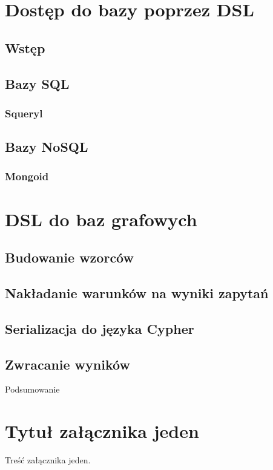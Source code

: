 \documentclass[brudnopis]{xmgr}
\begin{document}
\chapter{Dostęp do bazy poprzez DSL}

\section{Wstęp}

\section{Bazy SQL}

\subsection{Squeryl}

\section{Bazy NoSQL}

\subsection{Mongoid}

\chapter{DSL do baz grafowych}

\section{Budowanie wzorców}

\section{Nakładanie warunków na wyniki zapytań}

\section{Serializacja do języka Cypher}

\section{Zwracanie wyników}

\summary
Podsumowanie

\appendix
\chapter{Tytuł załącznika jeden}

Treść załącznika jeden.




\listoftables

\listoffigures

\oswiadczenie
\end{document}
